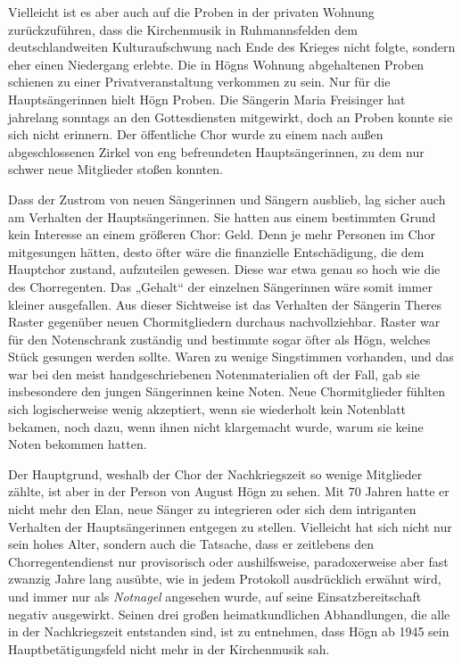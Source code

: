\documentclass{book}
\begin{document}
Vielleicht ist es aber auch auf die Proben in der privaten Wohnung
zurückzuführen, dass die Kirchenmusik in Ruhmannsfelden dem
deutschlandweiten Kulturaufschwung nach Ende des Krieges nicht
folgte, sondern eher einen Niedergang erlebte. Die in Högns Wohnung
abgehaltenen Proben schienen zu einer Privatveranstaltung verkommen zu
sein. Nur für die Hauptsängerinnen hielt Högn Proben. Die Sängerin
Maria Freisinger hat jahrelang sonntags an den Gottesdiensten
mitgewirkt, doch an Proben konnte sie sich nicht erinnern. Der
öffentliche Chor wurde zu einem nach außen abgeschlossenen Zirkel von
eng befreundeten Hauptsängerinnen, zu dem nur schwer neue Mitglieder
stoßen konnten.

Dass der Zustrom von neuen Sängerinnen und Sängern ausblieb, lag sicher
auch am Verhalten der Hauptsängerinnen. Sie hatten aus einem bestimmten
Grund kein Interesse an einem größeren Chor: Geld. Denn je mehr
Personen im Chor mitgesungen hätten, desto öfter wäre die finanzielle
Entschädigung, die dem Hauptchor zustand, aufzuteilen gewesen. Diese
war etwa genau so hoch wie die des Chorregenten. Das „Gehalt“ der
einzelnen Sängerinnen wäre somit immer kleiner ausgefallen. Aus
dieser Sichtweise ist das Verhalten der Sängerin Theres Raster
gegenüber neuen Chormitgliedern durchaus nachvollziehbar. Raster war
für den Notenschrank zuständig und bestimmte sogar öfter als Högn,
welches Stück gesungen werden sollte. Waren zu wenige Singstimmen
vorhanden, und das war bei den meist handgeschriebenen
Notenmaterialien oft der Fall, gab sie insbesondere den jungen
Sängerinnen keine Noten. Neue Chormitglieder fühlten sich
logischerweise wenig akzeptiert, wenn sie wiederholt kein Notenblatt
bekamen, noch dazu, wenn ihnen nicht klargemacht wurde, warum sie keine
Noten bekommen hatten.

Der Hauptgrund, weshalb der Chor der Nachkriegszeit so wenige
Mitglieder zählte, ist aber in der Person von August Högn zu sehen.
Mit 70 Jahren hatte er nicht mehr den Elan, neue Sänger zu integrieren
oder sich dem intriganten Verhalten der Hauptsängerinnen entgegen zu
stellen. Vielleicht hat sich nicht nur sein hohes Alter, sondern auch
die Tatsache, dass er zeitlebens den Chorregentendienst nur
provisorisch oder aushilfsweise, paradoxerweise aber fast zwanzig Jahre
lang ausübte, wie in jedem Protokoll ausdrücklich erwähnt wird, und
immer nur als \textit{Notnagel} angesehen wurde, auf seine
Einsatzbereitschaft negativ ausgewirkt. Seinen drei großen
heimatkundlichen Abhandlungen, die alle in der Nachkriegszeit
entstanden sind, ist zu entnehmen, dass Högn ab 1945 sein
Hauptbetätigungsfeld nicht mehr in der Kirchenmusik sah.
\end{document}
